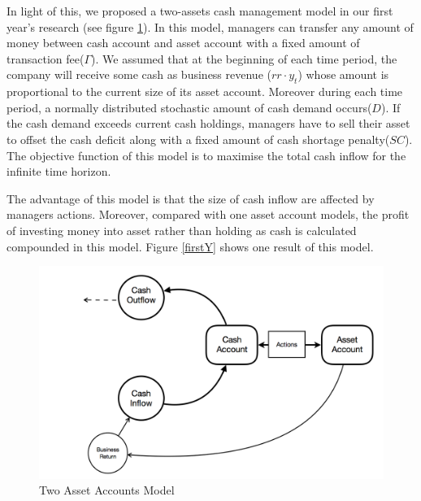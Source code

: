 \documentclass[12pt]{article}
\begin{document}
In light of this, we proposed a two-assets cash management model in our first year's research (see figure \ref{twoAsset}). In this model, managers can transfer any amount of money between cash account and asset account with a fixed amount of transaction fee($\Gamma$). We assumed that at the beginning of each time period, the company will receive some cash as business revenue ($rr \cdot y_t$) whose amount is proportional to the current size of its asset account. Moreover during each time period, a normally distributed stochastic amount of cash demand occurs($D$). If the cash demand exceeds current cash holdings, managers have to sell their asset to offset the cash deficit along with a fixed amount of cash shortage penalty($SC$). The objective function of this model is to maximise the total cash inflow for the infinite time horizon. 

The advantage of this model is that the size of cash inflow are affected by managers actions. Moreover, compared with one asset account models, the profit of investing money into asset rather than holding as cash is calculated compounded in this model. Figure \ref{firstY} shows one result of this model.






\begin{figure}
\begin{center}
\includegraphics[scale=.5]{twoAssets}
\end{center}
\caption{Two Asset Accounts Model}
\label{twoAsset}
\end{figure}
\end{document}
